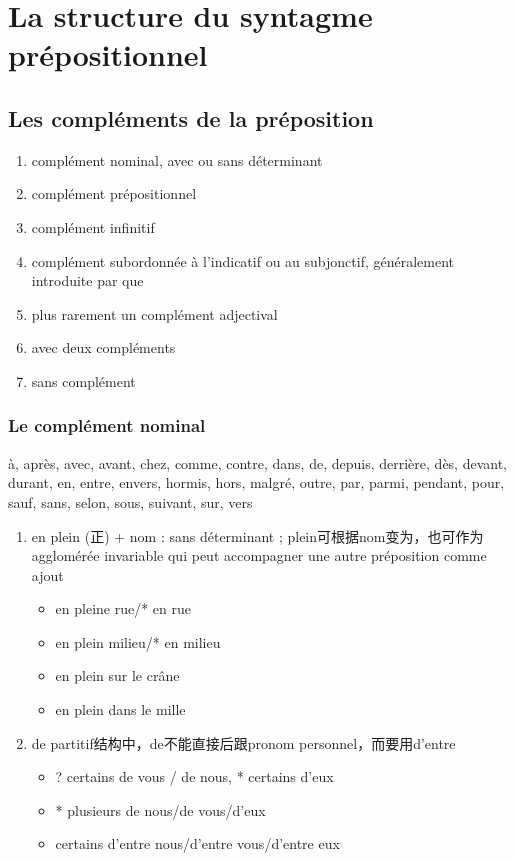 \documentclass[UTF8]{report}
\begin{document}
\section{La structure du syntagme prépositionnel}

\subsection{Les compléments de la préposition}
\begin{enumerate}
    \item complément nominal, avec ou sans déterminant
    \item complément prépositionnel
    \item complément infinitif
    \item complément subordonnée à l’indicatif ou au subjonctif, généralement introduite par que
    \item plus rarement un complément adjectival
    \item avec deux compléments 
    \item sans complément
\end{enumerate}

\subsubsection{Le complément nominal}
à, après, avec, avant, chez, comme, contre, dans, de, depuis, derrière, dès, devant, durant, en, entre, envers, hormis, hors, malgré, outre, par, parmi, pendant, pour, sauf, sans, selon, sous, suivant, sur, vers

\begin{enumerate}
    \item en plein (正) + nom : sans déterminant ; plein可根据nom变为，也可作为agglomérée invariable qui peut accompagner une autre préposition comme ajout
    \begin{itemize}
        \item en pleine rue/* en rue
        \item en plein milieu/* en milieu
        \item en plein sur le crâne
        \item en plein dans le mille
    \end{itemize}
    \item de partitif结构中，de不能直接后跟pronom personnel，而要用d’entre
    \begin{itemize}
        \item ? certains de vous / de nous, * certains d’eux
        \item * plusieurs de nous/de vous/d’eux
        \item certains d’entre nous/d’entre vous/d’entre eux
    \end{itemize}
\end{enumerate}
\end{document}
